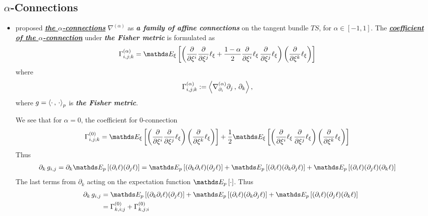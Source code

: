 \documentclass[11pt]{article}
\begin{document}
\subsection{$\alpha$-Connections}
\begin{itemize}
\item  \citep{amari2007methods} proposed \underline{\emph{\textbf{the $\alpha$-connections}}} $\nabla^{(\alpha)}$ as \emph{\textbf{a family of affine connections}} on the tangent bundle $TS$, for $\alpha \in [-1, 1]$. The \emph{\underline{\textbf{coefficient of the $\alpha$-connection}}} under \emph{\textbf{the Fisher metric}} is formulated as
\begin{align}
\Gamma_{i,j; k}^{(\alpha)} &= \E{\xi}{\paren{\partdiff{}{\xi^i}\partdiff{}{\xi^j}\ell_{\xi} + \frac{1 - \alpha}{2} \partdiff{}{\xi^i}\ell_{\xi}\, \partdiff{}{\xi^j}\ell_{\xi} }\paren{\partdiff{}{\xi^k}\ell_{\xi}}}  \label{eqn: alpha_connection_coefficient}
\end{align} where
\begin{align*}
\Gamma_{i,j; k}^{(\alpha)} &:= \left\langle \nabla^{(\alpha)}_{\partial_i}{\partial_j}\,,\, \partial_k \right\rangle,
\end{align*} where $g = \left\langle \cdot\,,\, \cdot \right\rangle_p$ is \emph{\textbf{the Fisher metric}}.

We see that for $\alpha = 0$, the coefficient for $0$-connection
\begin{align*}
\Gamma_{i,j; k}^{(0)} &= \E{\xi}{\paren{\partdiff{}{\xi^i}\partdiff{}{\xi^j}\ell_{\xi}}\paren{\partdiff{}{\xi^k}\ell_{\xi}}} + \frac{1}{2} \E{\xi}{\paren{ \partdiff{}{\xi^i}\ell_{\xi}\, \partdiff{}{\xi^j}\ell_{\xi} }\paren{\partdiff{}{\xi^k}\ell_{\xi}}} 
\end{align*}
Thus
\begin{align*}
\partial_k\,g_{i,j} = \partial_k \E{p}{(\partial_i \ell)(\partial_j \ell)} &= \E{p}{(\partial_k\partial_i\ell)(\partial_j \ell)} + \E{p}{(\partial_i\ell)(\partial_k\partial_j \ell)} + \E{p}{(\partial_i \ell)(\partial_j \ell)(\partial_k \ell)} 
\end{align*} The last terms from $\partial_k$ acting on the expectation function $\E{p}{\cdot}$. 
Thus
\begin{align*}
\partial_k\,g_{i,j} &= \E{p}{(\partial_k\partial_i\ell)(\partial_j \ell)} + \E{p}{(\partial_i\ell)(\partial_k\partial_j \ell)} + \E{p}{(\partial_i \ell)(\partial_j \ell)(\partial_k \ell)} \\
&= \Gamma_{k,i; j}^{(0)} + \Gamma_{k,j; i}^{(0)}
\end{align*}


\end{itemize}
\end{document}
